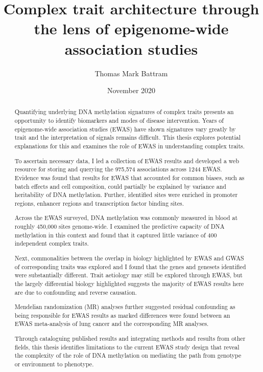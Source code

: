 \documentclass[11pt,twoside]{bristolthesis}
\title{Complex trait architecture through the lens of epigenome-wide association studies}
\author{Thomas Mark Battram}
\date{November 2020}
\begin{document}
  \maketitle

\frontmatter %
\pagestyle{empty} %
\begingroup
\makeatletter
{} 
\makeatother
  \begin{abstract}
    Quantifying underlying DNA methylation signatures of complex traits presents an opportunity to identify biomarkers and modes of disease intervention. Years of epigenome-wide association studies (EWAS) have shown signatures vary greatly by trait and the interpretation of signals remains difficult. This thesis explores potential explanations for this and examines the role of EWAS in understanding complex traits.

    To ascertain necessary data, I led a collection of EWAS results and developed a web resource for storing and querying the 975,574 associations across 1244 EWAS. Evidence was found that results for EWAS that accounted for common biases, such as batch effects and cell composition, could partially be explained by variance and heritability of DNA methylation. Further, identified sites were enriched in promoter regions, enhancer regions and transcription factor binding sites.

    Across the EWAS surveyed, DNA methylation was commonly measured in blood at roughly 450,000 sites genome-wide. I examined the predictive capacity of DNA methylation in this context and found that it captured little variance of 400 independent complex traits.

    Next, commonalities between the overlap in biology highlighted by EWAS and GWAS of corresponding traits was explored and I found that the genes and genesets identified were substantially different. Trait aetiology may still be explored through EWAS, but the largely differential biology highlighted suggests the majority of EWAS results here are due to confounding and reverse causation.

    Mendelian randomization (MR) analyses further suggested residual confounding as being responsible for EWAS results as marked differences were found between an EWAS meta-analysis of lung cancer and the corresponding MR analyses.

    Through cataloguing published results and integrating methods and results from other fields, this thesis identifies limitations to the current EWAS study design that reveal the complexity of the role of DNA methylation on mediating the path from genotype or environment to phenotype.
  \end{abstract}
\end{document}
